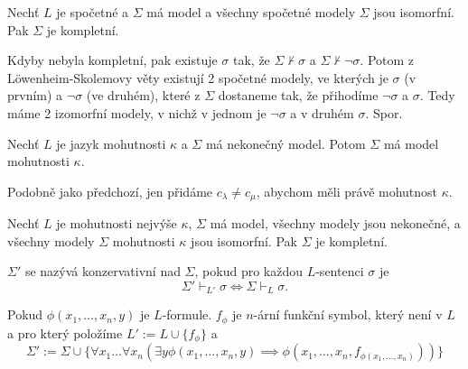 \documentclass[12pt]{article}                   %
\begin{document}
    \begin{tvrzeni}
        Nechť $L$ je spočetné a $\Sigma$ má model a všechny spočetné modely $\Sigma$ jsou isomorfní. Pak $\Sigma$ je kompletní.

        \begin{dukazin}
            Kdyby nebyla kompletní, pak existuje $\sigma$ tak, že $\Sigma \nvdash \sigma$ a $\Sigma \nvdash \neg\sigma$. Potom z Löwenheim-Skolemovy věty existují 2 spočetné modely, ve kterých je $\sigma$ (v prvním) a $\neg\sigma$ (ve druhém), které z $\Sigma$ dostaneme tak, že přihodíme $\neg \sigma$ a $\sigma$. Tedy máme 2 izomorfní modely, v nichž v jednom je $\neg\sigma$ a v druhém $\sigma$. Spor.
        \end{dukazin}
    \end{tvrzeni}

    \begin{veta}
        Nechť $L$ je jazyk mohutnosti $\kappa$ a $\Sigma$ má nekonečný model. Potom $\Sigma$ má model mohutnosti $\kappa$.

        \begin{dukazin}
            Podobně jako předchozí, jen přidáme $c_\lambda ≠ c_\mu$, abychom měli právě mohutnost $\kappa$.
        \end{dukazin}
    \end{veta}


    \begin{tvrzeni}
        Nechť $L$ je mohutnosti nejvýše $\kappa$, $\Sigma$ má model, všechny modely jsou nekonečné, a všechny modely $\Sigma$ mohutnosti $\kappa$ jsou isomorfní. Pak $\Sigma$ je kompletní.
    \end{tvrzeni}



    \begin{definice}
        $\Sigma'$ se nazývá konzervativní nad $\Sigma$, pokud pro každou $L$-sentenci $\sigma$ je
        $$ \Sigma' \vdash_{L'} \sigma \Leftrightarrow \Sigma \vdash_L \sigma. $$ 
    \end{definice}

    \begin{tvrzeni}
        Pokud $\phi(x_1, …, x_n, y)$ je $L$-formule. $f_{\phi}$ je $n$-ární funkční symbol, který není v $L$ a pro který položíme $L' := L\cup \{f_{\phi}\}$ a 
        $$ \Sigma' := \Sigma \cup \{\forall x_1…\forall x_n (\exists y \phi(x_1, …, x_n, y) \implies \phi(x_1, …, x_n, f_{\phi(x_1, …, x_n)}))\} $$ 
    \end{tvrzeni}
\end{document}
